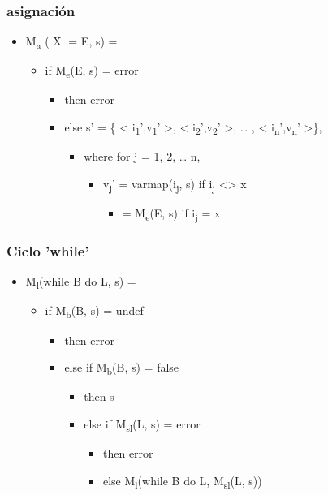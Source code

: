 \documentclass[11pt]{article}
\begin{document}
\subsubsection*{asignación}
\label{sec:org2590849}
\begin{itemize}
\item M\textsubscript{a} ( X := E, s) = 
\begin{itemize}
\item if M\textsubscript{e}(E, s) = error
\begin{itemize}
\item then error
\item else s' = \{ < i\textsubscript{1}',v\textsubscript{1}' >, < i\textsubscript{2}',v\textsubscript{2}' >, \ldots{} , < i\textsubscript{n}',v\textsubscript{n}' >\},
\begin{itemize}
\item where for j = 1, 2, \ldots{} n,
\begin{itemize}
\item v\textsubscript{j}' = varmap(i\textsubscript{j}, s) if i\textsubscript{j} <> x
\begin{itemize}
\item = M\textsubscript{e}(E, s) if i\textsubscript{j} = x
\end{itemize}
\end{itemize}
\end{itemize}
\end{itemize}
\end{itemize}
\end{itemize}

\subsubsection*{Ciclo 'while'}
\label{sec:org7ae08fb}
\begin{itemize}
\item M\textsubscript{l}(while B do L, s) =
\begin{itemize}
\item if M\textsubscript{b}(B, s) = undef
\begin{itemize}
\item then error
\item else if M\textsubscript{b}(B, s) = false
\begin{itemize}
\item then s
\item else if M\textsubscript{sl}(L, s) = error
\begin{itemize}
\item then error
\item else M\textsubscript{l}(while B do L, M\textsubscript{sl}(L, s))
\end{itemize}
\end{itemize}
\end{itemize}
\end{itemize}
\end{itemize}
\end{document}

